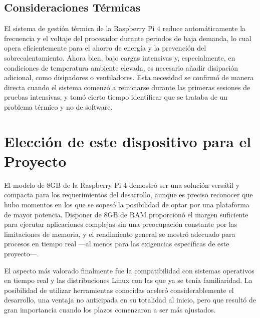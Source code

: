     \subsection{Consideraciones Térmicas}
    El sistema de gestión térmica de la Raspberry Pi 4 reduce automáticamente la frecuencia y el voltaje del procesador durante periodos de baja demanda, lo cual opera eficientemente para el ahorro de energía y la prevención del sobrecalentamiento. Ahora bien, bajo cargas intensivas y, especialmente, en condiciones de temperatura ambiente elevada, es necesario añadir disipación adicional, como disipadores o ventiladores. Esta necesidad se confirmó de manera directa cuando el sistema comenzó a reiniciarse durante las primeras sesiones de pruebas intensivas, y tomó cierto tiempo identificar que se trataba de un problema térmico y no de software.

\section{Elección de este dispositivo para el Proyecto}
    El modelo de 8GB de la Raspberry Pi 4 demostró ser una solución versátil y compacta para los requerimientos del desarrollo, aunque es preciso reconocer que hubo momentos en los que se sopesó la posibilidad de optar por una plataforma de mayor potencia. Disponer de 8GB de RAM proporcionó el margen suficiente para ejecutar aplicaciones complejas sin una preocupación constante por las limitaciones de memoria, y el rendimiento general se mostró adecuado para procesos en tiempo real —al menos para las exigencias específicas de este proyecto—.
    
    El aspecto más valorado finalmente fue la compatibilidad con sistemas operativos en tiempo real y las distribuciones Linux con las que ya se tenía familiaridad. La posibilidad de utilizar herramientas conocidas aceleró considerablemente el desarrollo, una ventaja no anticipada en su totalidad al inicio, pero que resultó de gran importancia cuando los plazos comenzaron a ser más ajustados.

